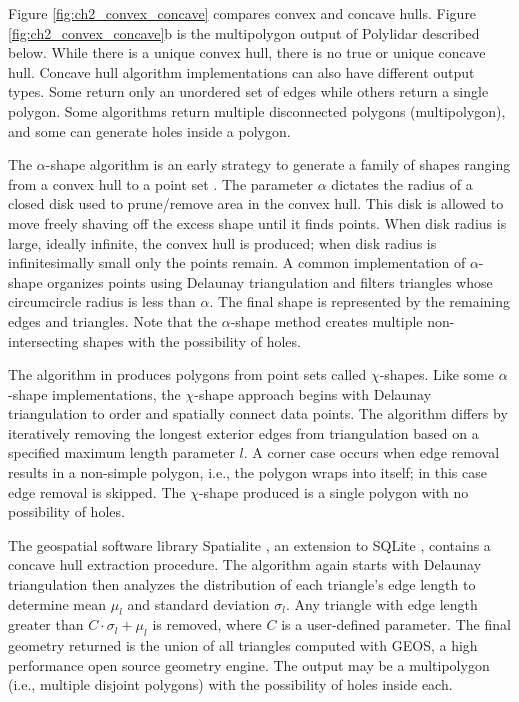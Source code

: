 Figure \ref{fig:ch2_convex_concave} compares convex and concave hulls. Figure \ref{fig:ch2_convex_concave}b is the multipolygon output of Polylidar described below.
While there is a unique convex hull, there is no true or unique concave hull.  Concave hull algorithm implementations can also have different output types.  Some return only an unordered set of edges while others return a single polygon.  Some algorithms return multiple disconnected polygons (multipolygon), and some can generate holes inside a polygon.

The $\alpha$-shape algorithm is an early strategy to generate a family of shapes ranging from a convex hull to a point set  \cite{edelsbrunner_shape_1983}. The parameter $\alpha$ dictates the radius of a closed disk used to prune/remove area in the convex hull. This disk is allowed to move freely shaving off the excess shape until it finds points. When disk radius is large, ideally infinite, the convex hull is produced; when disk radius is infinitesimally small only the points remain. A common implementation of $\alpha$-shape organizes points using Delaunay triangulation and filters triangles whose circumcircle radius is less than $\alpha$.  The final shape is represented by the remaining edges and triangles.  Note that the $\alpha$-shape method creates multiple non-intersecting shapes with the possibility of holes. 

The algorithm in \cite{duckham_efficient_2008} produces polygons from point sets called $\chi$-shapes. Like some $\alpha$-shape implementations, the $\chi$-shape approach begins with Delaunay triangulation to order and spatially connect data points.  The algorithm differs by iteratively removing the longest exterior edges from triangulation based on a specified maximum length parameter $l$. A corner case occurs  when edge removal results in a non-simple polygon, i.e., the polygon wraps into itself; in this case edge removal is skipped.  The $\chi$-shape produced is a single polygon with no possibility of holes.

The geospatial software library Spatialite \cite{furieri_spatialite_2017}, an extension to SQLite \cite{hipp_sqlite_2020}, contains a concave hull extraction procedure. The algorithm again starts with Delaunay triangulation then analyzes the distribution of each triangle's edge length to determine mean $\mu_l$ and standard deviation $\sigma_l$. Any triangle with edge length greater than $C \cdot \sigma_l  + \mu_l$ is removed, where $C$ is a user-defined parameter. The final geometry returned is the union of all triangles computed with GEOS, a high performance open source geometry engine. The output may be a multipolygon (i.e., multiple disjoint polygons) with the possibility of holes inside each. 

